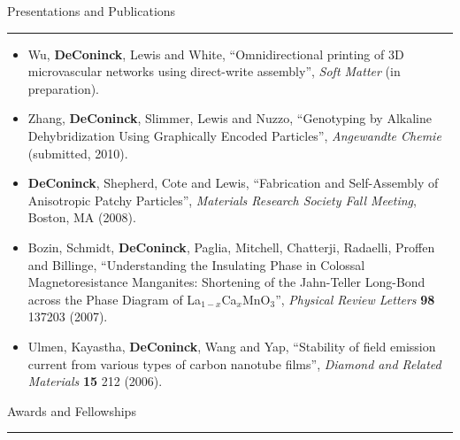 \documentclass[10pt]{article}
\newcommand{\bigsection}[1]{	
	\vspace{4pt}
	{\fontfamily{phv}\selectfont\Large#1}

	\vspace{-10pt} \rule{\textwidth}{1pt}
}
\begin{document}
\begin{itemize}
\end{itemize}

\bigsection{Presentations and Publications}
\vspace{-16pt}
\begin{itemize}\setlength{\itemsep}{0cm}
  \setlength{\parskip}{0cm}
	\item{Wu, \textbf{DeConinck}, Lewis and White,
 ``Omnidirectional printing of 3D microvascular networks using direct-write assembly'',
\textit{Soft Matter} (in preparation).}
	\item{Zhang, \textbf{DeConinck}, Slimmer, Lewis and Nuzzo, 
``Genotyping by Alkaline Dehybridization Using Graphically Encoded Particles'', 
\textit{Angewandte Chemie} (submitted, 2010).}


	\item{\textbf{DeConinck}, Shepherd, Cote and Lewis, 
``Fabrication and Self-Assembly of Anisotropic Patchy Particles'',
\textit{Materials Research Society Fall Meeting}, Boston, MA (2008).}
	
	\item{Bozin, Schmidt, \textbf{DeConinck}, Paglia, Mitchell, Chatterji, Radaelli, Proffen and Billinge, 
``Understanding the Insulating Phase in Colossal Magnetoresistance Manganites: Shortening of the Jahn-Teller Long-Bond across the Phase Diagram of La$_{1-x}$Ca$_x$MnO$_3$'', 
\textit{Physical Review Letters} \textbf{98} 137203 (2007).}
	\item{Ulmen, Kayastha, \textbf{DeConinck}, Wang and Yap, 
``Stability of field emission current from various types of carbon nanotube films'', 
\textit{Diamond and Related Materials} \textbf{15} 212 (2006).}
\end{itemize}

\bigsection{Awards and Fellowships}
\end{document}
